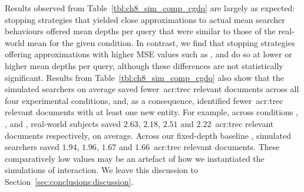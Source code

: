 Results observed from Table~\ref{tbl:ch8_sim_comp_cgdq} are largely as expected: stopping strategies that yielded close approximations to actual mean searcher behaviours offered mean depths per query that were similar to those of the real-world mean for the given condition. In contrast, we find that stopping strategies offering approximations with higher MSE values such as ,  and  do so at lower or higher mean depths per query, although these differences are not statistically significant. Results from Table~\ref{tbl:ch8_sim_comp_cgdq} also show that the simulated searchers on average saved fewer~\gls{acr:trec} relevant documents across all four experimental conditions, and, as a consequence, identified fewer~\gls{acr:trec} relevant documents with at least one new entity. For example, across conditions , ,  and , real-world subjects saved $2.63$, $2.18$, $2.51$ and $2.22$~\gls{acr:trec} relevant documents respectively, on average. Across our fixed-depth baseline , simulated searchers saved $1.94$, $1.96$, $1.67$ and $1.66$~\gls{acr:trec} relevant documents. These comparatively low values may be an artefact of how we instantiated the simulations of interaction. We leave this discussion to Section~\ref{sec:conclusions:discussion}.

